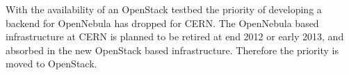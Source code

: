 With the availability of an OpenStack testbed the priority of developing a backend for OpenNebula has dropped for CERN. The OpenNebula based infrastructure at CERN is planned to be retired at end 2012 or early 2013, and absorbed in the new OpenStack based infrastructure. Therefore the priority is moved to OpenStack. 


